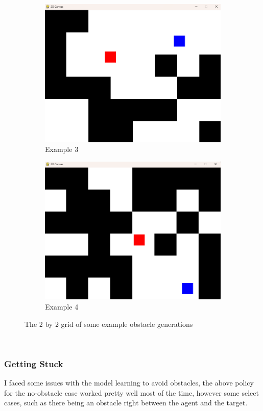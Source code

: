 \begin{figure}[htbp]
  \begin{subfigure}{0.45\textwidth}
      \centering
      \includegraphics[width=0.6\linewidth]{assets/early-work/obs-gen3.png}
      \caption{Example 3}
  \end{subfigure}%
  \hfill
  \begin{subfigure}{0.45\textwidth}
      \centering
      \includegraphics[width=0.6\linewidth]{assets/early-work/obs-gen4.png}
      \caption{Example 4}
  \end{subfigure}
  \caption{The 2 by 2 grid of some example obstacle generations}\label{fig:obs-gen}
\end{figure}\

\subsubsection{Getting Stuck}
I faced some issues with the model learning to avoid obstacles, the above policy for the no-obstacle case worked pretty well most of the time, however some select cases, such as there being an obstacle right between the agent and the target. 

